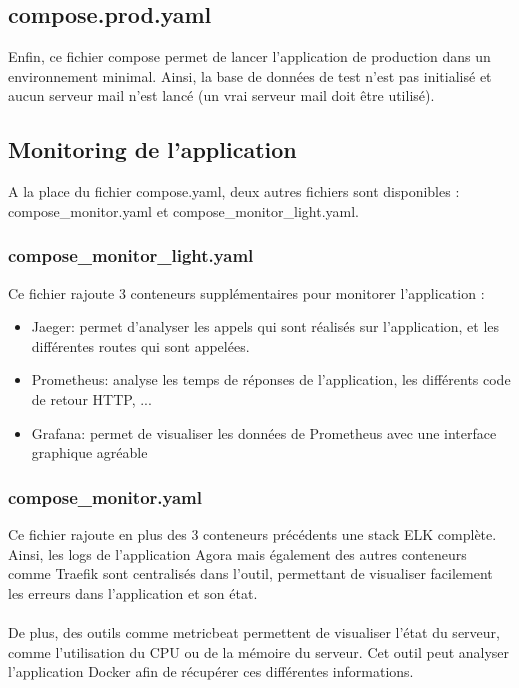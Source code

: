 \documentclass{article}
\begin{document}
        \subsection{compose.prod.yaml}

            Enfin, ce fichier compose permet de lancer l'application de production dans un environnement minimal. Ainsi, la base de données de test n'est pas initialisé et aucun serveur mail n'est lancé (un vrai serveur mail doit être utilisé).

        \subsection{Monitoring de l'application}

            A la place du fichier compose.yaml, deux autres fichiers sont disponibles : compose\_monitor.yaml et compose\_monitor\_light.yaml.

            \subsubsection{compose\_monitor\_light.yaml}

                Ce fichier rajoute 3 conteneurs supplémentaires pour monitorer l'application :
                \begin{itemize}
                    \item Jaeger: permet d'analyser les appels qui sont réalisés sur l'application, et les différentes routes qui sont appelées.
                    \item Prometheus: analyse les temps de réponses de l'application, les différents code de retour HTTP, ...
                    \item Grafana: permet de visualiser les données de Prometheus avec une interface graphique agréable
                \end{itemize}

            \subsubsection{compose\_monitor.yaml}

                Ce fichier rajoute en plus des 3 conteneurs précédents une stack ELK complète. Ainsi, les logs de l'application Agora mais également des autres conteneurs comme Traefik sont centralisés dans l'outil, permettant de visualiser facilement les erreurs dans l'application et son état.\\
                \\
                \indent De plus, des outils comme metricbeat permettent de visualiser l'état du serveur, comme l'utilisation du CPU ou de la mémoire du serveur. Cet outil peut analyser l'application Docker afin de récupérer ces différentes informations.
\end{document}
